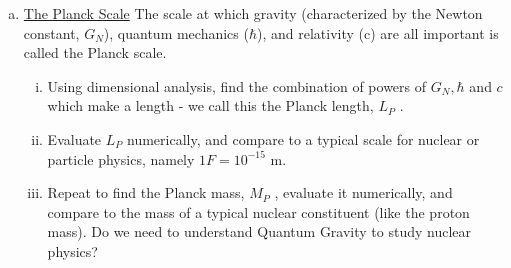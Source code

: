\documentclass[ps1.tex]{subfiles}
\begin{document}
\begin{enumerate}[(a)]
\item \underline{The Planck Scale}
\noindent
The scale at which gravity (characterized by the Newton constant, $G_N$), 
quantum mechanics ($\hbar$), and relativity (c) are all important is called the Planck scale.
\begin{enumerate}[i.]
\item Using dimensional analysis, find the combination of powers of $G_N, \hbar$ and $c$ which make a length - we call this the Planck length, $L_P$ .
\item Evaluate $L_P$  numerically, and compare to a typical scale for nuclear or particle physics, namely $1F = 10^{-15}$ m.
\item Repeat to find the Planck mass, $M_P$ , evaluate it numerically, and compare to the mass of a typical nuclear constituent (like the proton mass). Do we need to understand Quantum Gravity to study nuclear physics?
\end{enumerate}
\end{enumerate}
\noindent\makebox[\linewidth]{\rule{\paperwidth}{0.4pt}}
\end{document}
